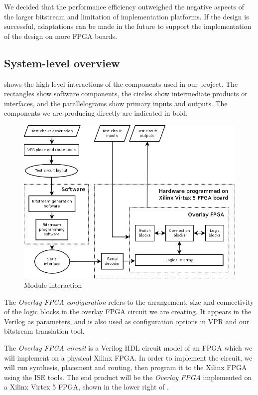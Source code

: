 We decided that the performance efficiency outweighed the negative aspects of the larger bitstream and limitation of implementation platforms.
If the design is successful, adaptations can be made in the future to support the implementation of the design on more FPGA boards.



\subsection{System-level overview} %
\label{system-overview}

 shows the high-level interactions of the components used in our project.
The rectangles show software components, the circles show intermediate products or interfaces, and the parallelograms show primary inputs and outputs.
The components we are producing directly are indicated in bold.

\begin{figure}[!h]
	\centering
	\includegraphics[scale=0.6]{modules.png}
	\caption{Module interaction}
	\label{module-diagram}
\end{figure}

The \emph{Overlay FPGA configuration} refers to the arrangement, size and connectivity of the logic blocks in the overlay FPGA circuit we are creating.
It appears in the Verilog as parameters, and is also used as configuration options in VPR and our bitstream translation tool.

The \emph{Overlay FPGA circuit} is a Verilog HDL circuit model of an FPGA which we will implement on a physical Xilinx FPGA.
In order to implement the circuit, we will run synthesis, placement and routing, then program it to the Xilinx FPGA using the ISE tools.
The end product will be the \emph{Overlay FPGA} implemented on a Xilinx Virtex 5 FPGA, shown in the lower right of .

